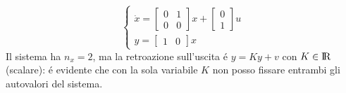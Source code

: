 \documentclass[../main.tex]{subfiles}
\begin{document}
		\begin{Exercise}[title={Retroazione algebrica sull'uscita}, difficulty=1]
			\[
				\begin{cases}
					\dot x=
					\begin{bmatrix}
						0 & 1\\
						0 & 0
					\end{bmatrix} x+
					\begin{bmatrix}
						0\\
						1
					\end{bmatrix} u
					\\
					y =
					\begin{bmatrix}
						1 & 0
					\end{bmatrix} x
				\end{cases}
			\]
			Il sistema ha $ n_x = 2 $, ma la retroazione sull'uscita \'e $ y = Ky + v $ con $ K \in \rm I\!R $ (scalare): \'e evidente che con la sola variabile $ K $ non posso fissare entrambi gli autovalori del sistema.
			

\end{Exercise}
\end{document}
